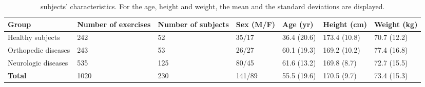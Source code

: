 \documentclass[../thesis.tex]{subfiles}
\begin{document}
\begin{table*}[t]
\begin{center}
\begin{tabular}{|p{3cm}|p{1.5cm}|p{1.5cm}|p{1.5cm}|p{1.5cm}|p{1.5cm}|p{1.5cm}|}
%
\hline
 \textbf{Group} &\textbf{Number of exercises}&\textbf{Number of subjects}&\textbf{Sex (M/F)}&\textbf{Age (yr)}&\textbf{Height (cm)}&\textbf{Weight (kg)}\\
\hline
\hline
Healthy subjects & 242 & 52 & 35/17 & 36.4 (20.6) &  173.4 (10.8) &  70.7 (12.2)\\
\hline
Orthopedic diseases & 243 & 53 & 26/27 & 60.1 (19.3) &  169.2 (10.2) &  77.4 (16.8)\\
\hline
Neurologic diseases & 535 & 125 & 80/45 & 61.6 (13.2) &  169.8 (8.7) &  72.7 (15.5)\\
\hline
\hline
\textbf{Total} & 1020 & 230 & 141/89 & 55.5 (19.6) &  170.5 (9.7) &  73.4 (15.3)\\
\hline
\end{tabular}
\end{center}
\caption{subjects' characteristics. For the age, height and weight, the mean and the standard deviations are displayed.}\label{tab:walk_sd:subjects}
\end{table*}
\end{document}
